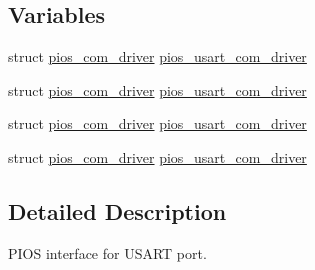 \subsection*{\-Variables}
\begin{DoxyCompactItemize}
\item 
struct \hyperlink{structpios__com__driver}{pios\-\_\-com\-\_\-driver} \hyperlink{group___p_i_o_s___u_s_a_r_t_gae7414398fe53c376d74ea4c0eecb0670}{pios\-\_\-usart\-\_\-com\-\_\-driver}
\item 
struct \hyperlink{structpios__com__driver}{pios\-\_\-com\-\_\-driver} \hyperlink{group___p_i_o_s___u_s_a_r_t_gae7414398fe53c376d74ea4c0eecb0670}{pios\-\_\-usart\-\_\-com\-\_\-driver}
\item 
struct \hyperlink{structpios__com__driver}{pios\-\_\-com\-\_\-driver} \hyperlink{group___p_i_o_s___u_s_a_r_t_gae7414398fe53c376d74ea4c0eecb0670}{pios\-\_\-usart\-\_\-com\-\_\-driver}
\item 
struct \hyperlink{structpios__com__driver}{pios\-\_\-com\-\_\-driver} \hyperlink{group___p_i_o_s___u_s_a_r_t_gae7414398fe53c376d74ea4c0eecb0670}{pios\-\_\-usart\-\_\-com\-\_\-driver}
\end{DoxyCompactItemize}


\subsection{\-Detailed \-Description}
\-P\-I\-O\-S interface for \-U\-S\-A\-R\-T port. 


